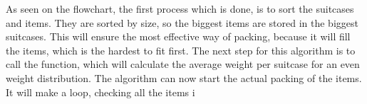 As seen on the flowchart, the first process which is done, is to sort the suitcases and items. They are sorted by size, so the biggest items are stored in the biggest suitcases. This will ensure the most effective way of packing, because it will fill the items, which is the hardest to fit first. The next step for this algorithm is to call the function, which will calculate the average weight per suitcase for an even weight distribution. The algorithm can now start the actual packing of the items.
It will make a loop, checking all the items i                                                                                                                                                                                                                                                                                                                                                                                                                                                                                                                                                                                                                                                                                                                                                                                                                                                                                                                                                                                                                                                                                                                                                                                                                                                                                                                                                                                                                                                                                                                                                                                                                                                                                                                                                                                                                                                                                                                                                                                                                                                                                                                                                                                                                                                                                                                                                                                                                                                                                                                                                                                                                                                                                                                                                                                                                                                                                                     